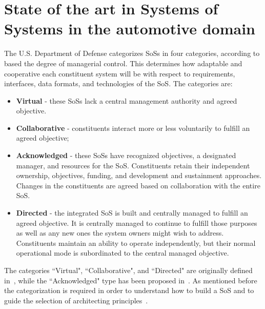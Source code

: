 \section{State of the art in Systems of Systems in the automotive domain}\label{sec:sota}




The U.S. Department of Defense categorizes SoSs  in four categories, according to based the degree of managerial control. This determines how adaptable and cooperative each constituent system will be with respect to requirements, interfaces, data formats, and technologies of the SoS. The categories are:

\begin{itemize}
\item {\bf Virtual} - these SoSs lack a central management authority and agreed objective.  
\item {\bf Collaborative} - constituents interact more or less voluntarily to fulfill an agreed objective;  
\item {\bf Acknowledged} - these SoSs have recognized objectives, a designated manager, and resources for the SoS. Constituents retain their independent ownership, objectives, funding, and development and sustainment approaches. Changes in the constituents are agreed based on collaboration with the entire SoS. 
\item {\bf Directed} - the integrated SoS is built and centrally managed to fulfill an agreed objective.  It is centrally managed to continue to fulfill those purposes as well as any new ones the system owners might wish to address. Constituents maintain an ability to operate independently, but their normal operational mode is subordinated to the central managed objective.
\end{itemize}

The categories ``Virtual", ``Collaborative", and ``Directed" are originally defined in~\cite{MeaningOfOf}, while the ``Acknowledged" type has been proposed in~\cite{maier1996sos}. As mentioned before the categorization is required in order to understand how to build a SoS and to guide the selection of architecting principles~\cite{Dahmann08}.

